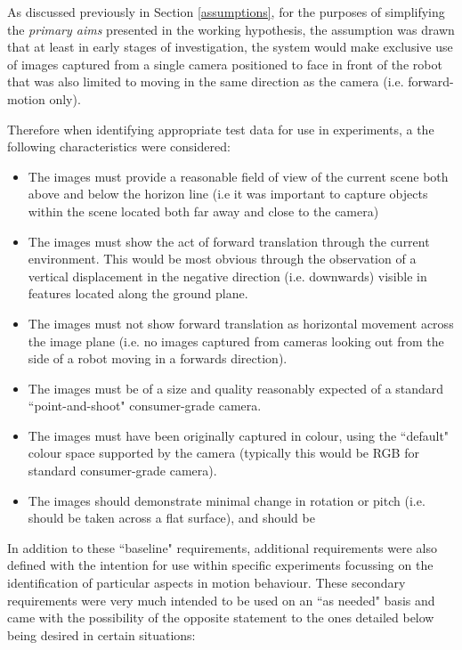 As discussed previously in Section \ref{assumptions}, for the purposes of simplifying the \textit{primary aims} presented in the working hypothesis, the assumption was drawn that at least in early stages of investigation, the system would make exclusive use of images captured from a single camera positioned to face in front of the robot that was also limited to moving in the same direction as the camera (i.e. forward-motion only).

Therefore when identifying appropriate test data for use in experiments, a the following characteristics were considered:

\begin{itemize}
	\item The images must provide a reasonable field of view of the current scene both above and below the horizon line (i.e it was important to capture objects within the scene located both far away and close to the camera)
	\item The images must show the act of forward translation through the current environment. This would be most obvious through the observation of a vertical displacement in the negative direction (i.e. downwards) visible in features located along the ground plane.
	\item The images must not show forward translation as horizontal movement across the image plane (i.e. no images captured from cameras looking out from the side of a robot moving in a forwards direction).
	\item The images must be of a size and quality reasonably expected of a standard ``point-and-shoot" consumer-grade camera.
	\item The images must have been originally captured in colour, using the ``default" colour space supported by the camera (typically this would be RGB for standard consumer-grade camera).
	 \item The images should demonstrate minimal change in rotation or pitch (i.e. should be taken across a flat surface), and should be 
\end{itemize}

In addition to these ``baseline" requirements, additional requirements were also defined with the intention for use within specific experiments focussing on the identification of particular aspects in motion behaviour. These secondary requirements were very much intended to be used on an ``as needed" basis and came with the possibility of the opposite statement to the ones detailed below being desired in certain situations:

